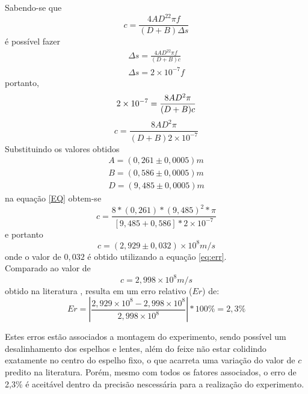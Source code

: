 Sabendo-se que
\begin{equation}
	c = \frac{4AD^22\pi f}{(D+B)\Delta s}
\end{equation}
é possível fazer
\begin{equation}
\begin{split}
	\Delta s = \frac{4AD^22\pi f}{(D+B)c}\\
	\Delta s = 2\times10^{-7}f
\end{split}
\end{equation}
portanto,
\begin{equation}
	2\times10^{-7}=\frac{8AD^2\pi}{(D+B)c}\\
\end{equation}
\begin{equation}
	c=\frac{8AD^2\pi}{(D+B)2\times10^{-7}}
\label{EQ}
\end{equation}
Substituindo os valores obtidos
\begin{equation}
	\begin{split}
		A = (0,261\pm0,0005)m\\
		B = (0,586\pm0,0005)m\\
		D = (9,485\pm0,0005)m
	\end{split}
\end{equation}
na equação \ref{EQ} obtem-se
\begin{equation}
	c=\frac{8*(0,261)*(9,485)^2*\pi}{[9,485+0,586]*2\times10^{-7}}
\end{equation}
e portanto
\begin{equation}
	c=(2,929\pm0,032)\times10^{8} m/s
\end{equation}
onde o valor de $0,032$ é obtido utilizando a equação \ref{eq:err}.\\
Comparado ao valor de 
\begin{equation}
	c=2,998\times10^{8} m/s
\end{equation}        
obtido na literatura \cite{PASCO}, resulta em um erro relativo ($Er$) de:
\begin{equation}
	Er=|\frac{2,929\times10^{8}-2,998\times10^{8}}{2,998\times10^{8}}|*100\%= 2,3\%
\end{equation}

Estes erros estão associados a montagem do experimento, sendo
possível um desalinhamento dos espelhos e lentes, além do feixe não estar colidindo exatamente no
centro do espelho fixo, o que acarreta uma variação do valor de $c$ predito na literatura. Porém, mesmo com todos os fatores associados, o erro  de
2,3\% é aceitável dentro da precisão nescessária para a realização
do experimento.


